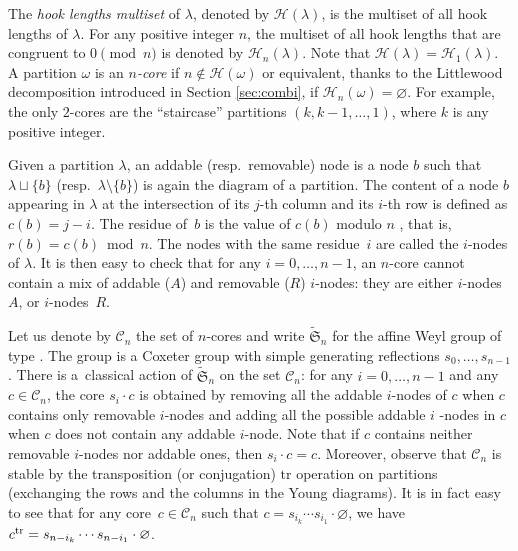 \documentclass[10pt,a4paper]{amsart}
\numberwithin{equation}{section}
\def\cch{\mathcal H}
\begin{document}
 The \textit{hook lengths multiset} of $\lambda$, denoted by $\mathcal{H}(\lambda)$, is the multiset of all hook lengths of $\lambda$. For any positive integer $n$, the multiset of all hook lengths that are congruent to $0 \pmod n$ is denoted by $\mathcal{H}_n(\lambda)$. Note that $\mathcal{H}(\lambda)=\mathcal{H}_1(\lambda)$. A partition $\omega$ is an \textit{$n$-core} if $n\not\in \cch(\omega)$ or equivalent, thanks to the Littlewood decomposition introduced in Section \ref{sec:combi}, if $\cch_n(\omega)=\varnothing$. For example, the only $2$-cores are the ``staircase'' partitions $(k,k-1,\dots,1)$, where $k$ is any positive integer.

Given a partition $\lambda $, an addable (resp.\ removable) node is a
node $b$ such that $\lambda \sqcup \{b\}$ (resp.~${\lambda \setminus \{b\}}$)
is again the diagram of a partition. The content of a node $b$ appearing in $%
\lambda $ at the intersection of its $j$-th column and its $i$-th row is
defined as $c(b)=j-i$. The residue of~$b$ is the value of $c(b)$ modulo $n$%
, that is, $r(b)=c(b)\bmod n$. The nodes with the same residue~$i$ are
called the $i$-nodes of $\lambda $. It is then easy to check that for any $%
i=0,\dots ,n-1$, an $n$-core cannot contain a mix of addable ($A$) and
removable ($R$) $i$-nodes: they are either $i$-nodes $A$, or $i$-nodes~$R$.

Let us denote by $\mathcal{C}_{n}$ the set of $n$-cores and write $%
\widetilde{\mathfrak{S}}_{n}$ for the affine Weyl group of type .
The group  is a Coxeter group
with simple generating reflections $s_{0},\dots ,s_{n-1}$. There is
a~classical action of $\widetilde{\mathfrak{S}}_{n}$ on the set $\mathcal{C}%
_{n}$: for any $i=0,\dots ,n-1$ and any $c\in \mathcal{C}_{n}$, the core $%
s_{i}\cdot c$ is obtained by removing all the addable $i$-nodes of $c$ when $%
c$ contains only removable $i$-nodes and adding all the possible addable $i$%
-nodes in $c$ when $c$ does not contain any addable $i$-node. Note that if $c$ contains neither removable $i$-nodes nor addable ones, then $%
s_{i}\cdot c=c$. Moreover, observe that $%
\mathcal{C}_{n}$ is stable by the transposition (or conjugation) $\mathrm{tr}
$ operation on partitions (exchanging the rows and the columns in the Young
diagrams). It is in fact easy to see that for any core~${c\in \mathcal{C}_{n}}$
such that $c=s_{i_{k}}\cdots s_{i_{1}}\cdot \varnothing $, we have $c^{\mathrm{%
tr}}=s_{n-i_{k}}\cdots s_{n-i_{1}}\cdot \varnothing $.
\end{document}
